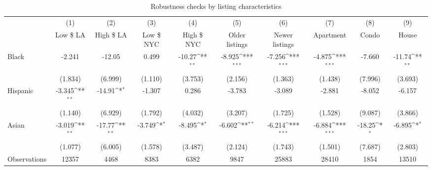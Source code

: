 \begin{landscape}

{
\def\sym#1{\ifmmode^{#1}\else\(^{#1}\)\fi}
\begin{longtable}{l*{9}{c}}
\caption{Robustness checks by listing characteristics}\\
\hline\hline\endfirsthead\hline\endhead\hline\endfoot\endlastfoot
                    &\multicolumn{1}{c}{(1)}&\multicolumn{1}{c}{(2)}&\multicolumn{1}{c}{(3)}&\multicolumn{1}{c}{(4)}&\multicolumn{1}{c}{(5)}&\multicolumn{1}{c}{(6)}&\multicolumn{1}{c}{(7)}&\multicolumn{1}{c}{(8)}&\multicolumn{1}{c}{(9)}\\
                    &\multicolumn{1}{c}{Low \$ LA}&\multicolumn{1}{c}{High \$ LA}&\multicolumn{1}{c}{Low \$ NYC}&\multicolumn{1}{c}{High \$ NYC}&\multicolumn{1}{c}{Older listings}&\multicolumn{1}{c}{Newer listings}&\multicolumn{1}{c}{Apartment}&\multicolumn{1}{c}{Condo}&\multicolumn{1}{c}{House}\\
\hline
Black               &      -2.241         &      -12.05         &       0.499         &      -10.27\sym{**} &      -8.925\sym{***}&      -7.256\sym{***}&      -4.875\sym{***}&      -7.660         &      -11.74\sym{**} \\
                    &     (1.834)         &     (6.999)         &     (1.110)         &     (3.753)         &     (2.156)         &     (1.363)         &     (1.438)         &     (7.996)         &     (3.693)         \\
[1em]
Hispanic            &      -3.345\sym{**} &      -14.91\sym{*}  &      -1.307         &       0.286         &      -3.783         &      -3.089         &      -2.881         &      -8.052         &      -6.157         \\
                    &     (1.140)         &     (6.929)         &     (1.792)         &     (4.032)         &     (3.207)         &     (1.725)         &     (1.528)         &     (9.087)         &     (3.866)         \\
[1em]
Asian               &      -3.019\sym{**} &      -17.77\sym{**} &      -3.749\sym{*}  &      -8.495\sym{*}  &      -6.602\sym{**} &      -6.214\sym{***}&      -6.884\sym{***}&      -18.25\sym{*}  &      -6.895\sym{*}  \\
                    &     (1.077)         &     (6.005)         &     (1.578)         &     (3.487)         &     (2.124)         &     (1.743)         &     (1.501)         &     (7.687)         &     (2.803)         \\
\hline
Observations        &       12357         &        4468         &        8383         &        6382         &        9847         &       25883         &       28410         &        1854         &       13510         \\

\end{longtable}}
\end{landscape}

